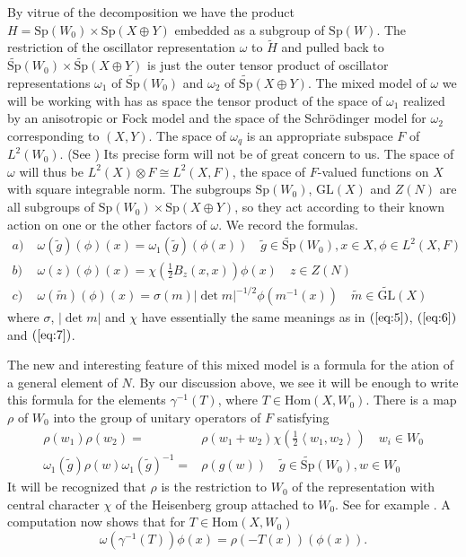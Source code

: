 \documentclass[12pt]{amsart}
\def\inn#1#2{\left\langle{#1},{#2}\right\rangle}
\def\abs#1{\left|{#1}\right|}
\def\Sp{{\mathrm{Sp}}}
\def\tSp{{\widetilde{\mathrm{Sp}}}}
\def\GL{{\mathrm{GL}}}
\def\tGL{{\widetilde{\mathrm{GL}}}}
\def\Hom{{\mathrm{Hom}}}
\def\tg{{\widetilde{g}}}
\def\tm{{\widetilde{m}}}
\def\tH{{\widetilde{H}}}
\begin{document}
By vitrue of the decomposition we have the product 
$H=\Sp(W_0)\times \Sp(X\oplus Y)$ embedded as a subgroup 
of $\Sp(W)$. The restriction of the oscillator representation 
$\omega$ to $\tH$ and pulled back to $\tSp(W_0)\times \tSp(X\oplus Y)$
is just the outer tensor product of oscillator representations $\omega_1$
of $\tSp(W_0)$ and $\omega_2$ of $\tSp(X\oplus Y)$. The mixed model 
of $\omega$ we will be working 
with has as space the tensor product of the space of $\omega_1$ realized by 
an anisotropic or Fock model and the space of the Schr\"odinger model 
for $\omega_2$ corresponding to $(X,Y)$. 
The space of $\omega_q$ is an appropriate subspace $F$ of $L^2(W_0)$. 
(See \cite{HoweOsc2}) Its precise form will not be of great concern to us. 
The space of $\omega$ will thus be $L^2(X)\otimes F \cong L^2(X,F)$, 
the space of $F$-valued functions on $X$ with square integrable norm. 
The subgroups $\Sp(W_0)$, $\GL(X)$ and $Z(N)$ are all subgroups
of $\Sp(W_0)\times \Sp(X\oplus Y)$, so they act according to their
known action on one or the other factors of $\omega$. 
We record the formulas.
\begin{equation}
\begin{split}
a)\; & \omega(\tg)(\phi)(x)=\omega_1(\tg)(\phi(x))\quad \tg\in \tSp(W_0), 
x\in X, \phi\in L^2(X,F)\\
b)\; & \omega(z)(\phi)(x) = \chi(\frac{1}{2}B_z(x,x))\phi(x)\quad z\in Z(N)\\
c)\; & \omega(\tm)(\phi)(x) = \sigma(m)\abs{\det m}^{-1/2}\phi(m^{-1}(x))
\quad \tm\in \tGL(X)
\end{split}
\end{equation}
where $\sigma$, $\abs{\det m}$ and $\chi$ have essentially the same 
meanings as in $(\ref{eq:5})$, $(\ref{eq:6})$ and $(\ref{eq:7})$.

The new and interesting feature of this mixed model is a formula for 
the ation of a general element of $N$. By our discussion above, 
we see it will be enough to write this formula for the 
elements $\gamma^{-1}(T)$, where $T\in \Hom(X,W_0)$. 
There is a map $\rho$ of $W_0$ into the group of unitary operators of $F$ 
satisfying
\begin{equation}
\begin{split}
\rho(w_1)\rho(w_2)=&\rho(w_1+w_2)\chi(\frac{1}{2}\inn{w_1}{w_2}) 
\quad w_i \in W_0\\
\omega_1(\tg)\rho(w)\omega_1(\tg)^{-1} =& \rho(g(w))\quad \tg \in \tSp(W_0), 
w\in W_0
\end{split}
\end{equation}
It will be recognized that $\rho$ is the restriction to $W_0$ of
the representation with central character $\chi$ of the Heisenberg group
attached to $W_0$. 
See for example \cite{Howe1979}. A computation now shows that for 
$T\in \Hom(X,W_0)$
\begin{equation}\label{eq:19}
\omega(\gamma^{-1}(T))\phi(x) = \rho(-T(x))(\phi(x)).
\end{equation}
\end{document}
